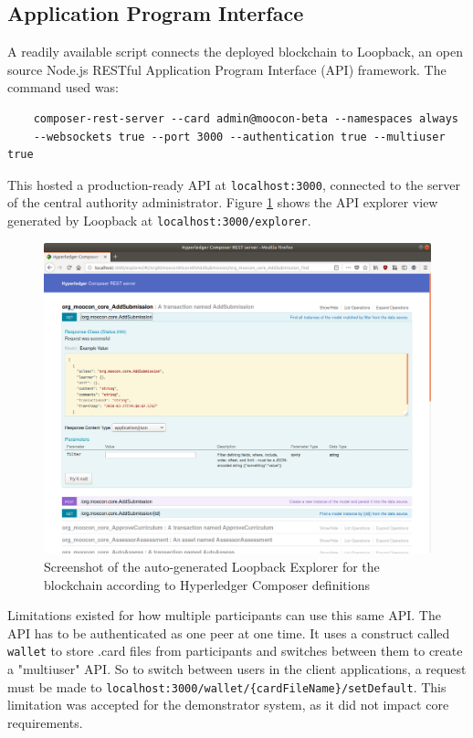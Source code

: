 \subsection{Application Program Interface}

A readily available script connects the deployed blockchain to Loopback, an open source Node.js RESTful
Application Program Interface (API) framework. The command used was:

\begin{verbatim}
	composer-rest-server --card admin@moocon-beta --namespaces always 
	--websockets true --port 3000 --authentication true --multiuser true
\end{verbatim}

This hosted a production-ready API at \texttt{localhost:3000}, connected to the
server of the central authority administrator.
Figure \ref{fig:Loopback_explorer} shows the API explorer view generated by Loopback at \texttt{localhost:3000/explorer}.

\begin{figure}[!ht]
	\centering
	\includegraphics[width=1.0\textwidth]{Loopback_explorer}
	\caption[Hyperledger Composer Loopback REST API Screenshot]
	{Screenshot of the auto-generated Loopback Explorer for the blockchain according to Hyperledger Composer definitions}
	\label{fig:Loopback_explorer}
\end{figure}

Limitations existed for how multiple participants can use this same API. The API has to be authenticated as
one peer at one time. It uses a construct called \texttt{wallet} to store .card files from participants and
switches between them to create a "multiuser" API. So to switch between users in the
client applications, a request must be made to \texttt{localhost:3000/wallet/\{cardFileName\}/setDefault}.
This limitation was accepted for the demonstrator system, as it did not impact core requirements.

